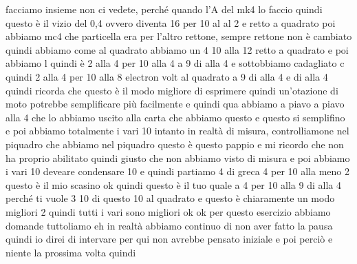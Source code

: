 \begin{soluzione}
{facciamo insieme non ci vedete, perché quando l'A del mk4 lo faccio quindi questo è il vizio del 0,4 ovvero diventa 16 per 10 al al 2 e retto a quadrato poi abbiamo mc4 che particella era per l'altro rettone, sempre rettone non è cambiato quindi abbiamo come al quadrato abbiamo un 4 10 alla 12 retto a quadrato e poi abbiamo l quindi è 2 alla 4 per 10 alla 4 a 9 di alla 4 e sottobbiamo cadagliato c quindi 2 alla 4 per 10 alla 8 electron volt al quadrato a 9 di alla 4 e di alla 4 quindi ricorda che questo è il modo migliore di esprimere quindi un'otazione di moto potrebbe semplificare più facilmente e quindi qua abbiamo a piavo a piavo alla 4 che lo abbiamo uscito alla carta che abbiamo questo e questo si semplifino e poi abbiamo totalmente i vari 10 intanto in realtà di misura, controlliamone nel piquadro che abbiamo nel piquadro questo è questo pappio e mi ricordo che non ha proprio abilitato quindi giusto che non abbiamo visto di misura e poi abbiamo i vari 10 deveare condensare 10 e quindi partiamo 4 di greca 4 per 10 alla meno 2 questo è il mio scasino ok quindi questo è il tuo quale a 4 per 10 alla 9 di alla 4 perché ti vuole 3 10 di questo 10 al quadrato e questo è chiaramente un modo migliori 2 quindi tutti i vari sono migliori ok ok per questo esercizio abbiamo domande tuttoliamo eh in realtà abbiamo continuo di non aver fatto la pausa quindi io direi di intervare per qui non avrebbe pensato iniziale e poi perciò e niente la prossima volta quindi

}
\end{soluzione}
